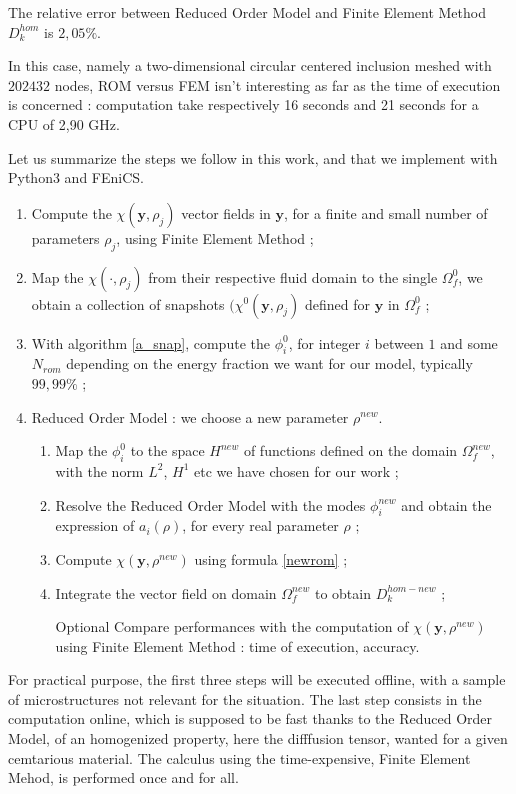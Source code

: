 The relative error between Reduced Order Model and Finite Element Method $D_k^{hom}$ is $2,05\%$.

\par
In this case, namely a two-dimensional circular centered inclusion meshed with $202432$ nodes, %
ROM versus FEM isn't interesting as far as the time of execution is concerned : %
computation take respectively 16 seconds and 21 seconds for a CPU of 2,90 GHz.

\ligneinter
Let us summarize the steps we follow in this work, and that we implement with Python3 and FEniCS.

\begin{algo}\label{a_rom}
\begin{enumerate}[label=\textbf{S \hspace{-7pt} \Roman*}]
\item Compute the $\chi\left(\mathbf{y},\rho_j\right)$ vector fields in $\mathbf{y}$, for a finite and small number of parameters $\rho_j$, %
using Finite Element Method ;
\item Map the $\chi (\cdot,\rho_j)$ from their respective fluid domain to the single $\Omega_f^0$, we obtain a collection of snapshots $(\chi^0(\mathbf{y},\rho_j)$ %
defined for $\mathbf{y}$ in $\Omega_f^0$ ;
\item With algorithm \ref{a_snap}, compute the $\phi^0_i$, for integer $i$ between $1$ and some $N_{rom}$ depending on the energy fraction we want for our model, typically $99,99\%$ ;
\item Reduced Order Model : we choose a new parameter $\rho^{new}$.
\begin{enumerate}[label=(\textbf{se}\ \roman*)]
\item Map the $\phi_i^0$ to the space $H^{new}$ of functions defined on the domain $\Omega_f^{new}$, with the norm $L^2$, $H^1$ etc we have chosen for our work ;
\item Resolve the Reduced Order Model with the modes $\phi_i^{new}$ and obtain the expression of $a_i(\rho)$, for every real parameter $\rho$ ;
\item Compute $\chi(\mathbf{y},\rho^{new})$ using formula \ref{newrom} ;
\item Integrate the vector field on domain $\Omega_f^{new}$ to obtain $D_k^{hom-new}$ ;
\item[Optional] Compare performances with the computation of $\chi(\mathbf{y},\rho^{new})$ using Finite Element Method : %
time of execution, accuracy.
\end{enumerate}
\end{enumerate}
\end{algo}

\medskip
For practical purpose, the first three steps will be executed offline, with a sample of microstructures not relevant for the situation. %
The last step consists in the computation online, which is supposed to be fast thanks to the Reduced Order Model, %
of an homogenized property, here the difffusion tensor, wanted for a given cemtarious material.
The calculus using the time-expensive, Finite Element Mehod, is performed once and for all.